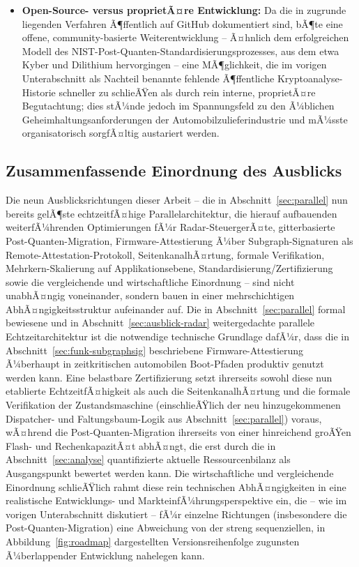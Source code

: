 ﻿\documentclass[a4paper,12pt]{article}
\theoremstyle{definition}
\begin{document}
\begin{itemize}
	\item \textbf{Open-Source- versus proprietÃ¤re Entwicklung:} Da die in \cite{Epp26a,Epp26b,Epp26c,Epp26d} zugrunde liegenden Verfahren Ã¶ffentlich auf GitHub dokumentiert sind, bÃ¶te eine offene, community-basierte Weiterentwicklung -- Ã¤hnlich dem erfolgreichen Modell des NIST-Post-Quanten-Standardisierungsprozesses, aus dem etwa Kyber und Dilithium hervorgingen -- eine MÃ¶glichkeit, die im vorigen Unterabschnitt als Nachteil benannte fehlende Ã¶ffentliche Kryptoanalyse-Historie schneller zu schlieÃŸen als durch rein interne, proprietÃ¤re Begutachtung; dies stÃ¼nde jedoch im Spannungsfeld zu den Ã¼blichen Geheimhaltungsanforderungen der Automobilzulieferindustrie und mÃ¼sste organisatorisch sorgfÃ¤ltig austariert werden.
\end{itemize}

\subsection{Zusammenfassende Einordnung des Ausblicks}
\label{sec:ausblick-einordnung}

Die neun Ausblicksrichtungen dieser Arbeit -- die in Abschnitt~\ref{sec:parallel} nun bereits gelÃ¶ste echtzeitfÃ¤hige Parallelarchitektur, die hierauf aufbauenden weiterfÃ¼hrenden Optimierungen fÃ¼r Radar-SteuergerÃ¤te, gitterbasierte Post-Quanten-Migration, Firmware-Attestierung Ã¼ber Subgraph-Signaturen als Remote-Attestation-Protokoll, SeitenkanalhÃ¤rtung, formale Verifikation, Mehrkern-Skalierung auf Applikationsebene, Standardisierung/Zertifizierung sowie die vergleichende und wirtschaftliche Einordnung -- sind nicht unabhÃ¤ngig voneinander, sondern bauen in einer mehrschichtigen AbhÃ¤ngigkeitsstruktur aufeinander auf. Die in Abschnitt~\ref{sec:parallel} formal bewiesene und in Abschnitt~\ref{sec:ausblick-radar} weitergedachte parallele Echtzeitarchitektur ist die notwendige technische Grundlage dafÃ¼r, dass die in Abschnitt~\ref{sec:funk-subgraphsig} beschriebene Firmware-Attestierung Ã¼berhaupt in zeitkritischen automobilen Boot-Pfaden produktiv genutzt werden kann. Eine belastbare Zertifizierung setzt ihrerseits sowohl diese nun etablierte EchtzeitfÃ¤higkeit als auch die SeitenkanalhÃ¤rtung und die formale Verifikation der Zustandsmaschine (einschlieÃŸlich der neu hinzugekommenen Dispatcher- und Faltungsbaum-Logik aus Abschnitt~\ref{sec:parallel}) voraus, wÃ¤hrend die Post-Quanten-Migration ihrerseits von einer hinreichend groÃŸen Flash- und RechenkapazitÃ¤t abhÃ¤ngt, die erst durch die in Abschnitt~\ref{sec:analyse} quantifizierte aktuelle Ressourcenbilanz als Ausgangspunkt bewertet werden kann. Die wirtschaftliche und vergleichende Einordnung schlieÃŸlich rahmt diese rein technischen AbhÃ¤ngigkeiten in eine realistische Entwicklungs- und MarkteinfÃ¼hrungsperspektive ein, die -- wie im vorigen Unterabschnitt diskutiert -- fÃ¼r einzelne Richtungen (insbesondere die Post-Quanten-Migration) eine Abweichung von der streng sequenziellen, in Abbildung~\ref{fig:roadmap} dargestellten Versionsreihenfolge zugunsten Ã¼berlappender Entwicklung nahelegen kann.
\end{document}

